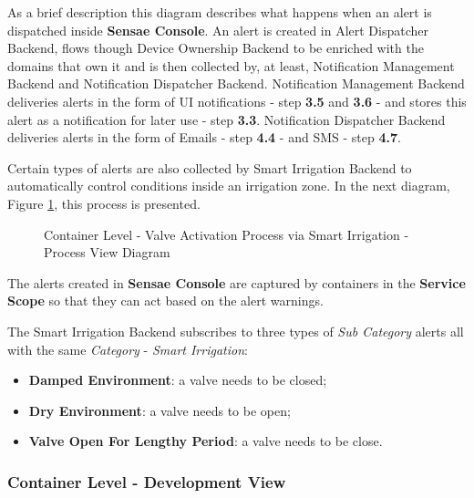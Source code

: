 As a brief description this diagram describes what happens when an alert is dispatched inside \textbf{Sensae Console}. An alert is created in Alert Dispatcher Backend, flows though Device Ownership Backend to be enriched with the domains that own it and is then collected by, at least, Notification Management Backend and Notification Dispatcher Backend. Notification Management Backend deliveries alerts in the form of \gls{UI} notifications - step \textbf{3.5} and \textbf{3.6} - and stores this alert as a notification for later use - step \textbf{3.3}. Notification Dispatcher Backend deliveries alerts in the form of Emails - step \textbf{4.4} - and SMS - step \textbf{4.7}.

Certain types of alerts are also collected by Smart Irrigation Backend to automatically control conditions inside an irrigation zone. In the next diagram, Figure \ref{fig:design:architecture:container:process:diagram:irrigation}, this process is presented.

\begin{figure}[H]
   \centering
   \resizebox{\columnwidth}{!}
   {
      
   }
   \caption[Container Level - Valve Activation Process via Smart Irrigation - Process View Diagram]{Container Level - Valve Activation Process via Smart Irrigation - Process View Diagram}
   \label{fig:design:architecture:container:process:diagram:irrigation}
\end{figure}

The alerts created in \textbf{Sensae Console} are captured by containers in the \textbf{Service Scope} so that they can act based on the alert warnings.

The Smart Irrigation Backend subscribes to three types of \textit{Sub Category} alerts all with the same \textit{Category} - \textit{Smart Irrigation}:

\begin{itemize}
   \item \textbf{Damped Environment}: a valve needs to be closed;
   \item \textbf{Dry Environment}: a valve needs to be open;
   \item \textbf{Valve Open For Lengthy Period}: a valve needs to be close.
\end{itemize}

\subsubsection*{Container Level - Development View}
\label{subsubsec:design:architecture:container:development}

